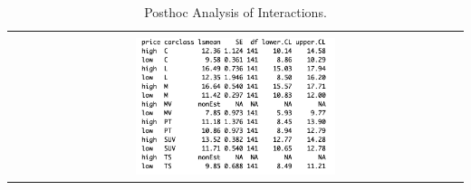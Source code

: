 \documentclass[acmsmall]{acmart}
\begin{document}
 \begin{table}[H]
\centering
\begin{tabular}{p{}}
	\hline
	\multicolumn{1}{|c|}{}\\
		\multicolumn{1}{|c|}{\includegraphics[width=0.45\textwidth]{../graphics/TWAls}}\\
		\hline
	\end{tabular}		
	\caption{Posthoc Analysis of Interactions.} %
	\label{fig:TWALS}
\end{table}
\end{document}

